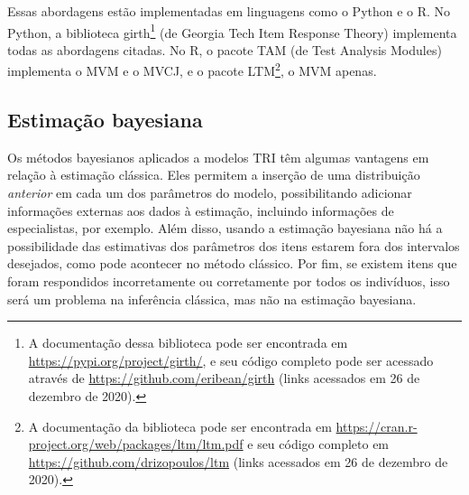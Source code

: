 \documentclass[
	12pt,				%
	openright,			%
	twoside,			%
	a4paper,			%
	english,			%
	brazil				%
	]{abntex2}
\begin{document}
 
 Essas abordagens estão implementadas em linguagens como o Python e o R. No Python, a biblioteca girth\footnote{A documentação dessa biblioteca pode ser encontrada em \url{https://pypi.org/project/girth/}, e seu código completo pode ser acessado através de \url{https://github.com/eribean/girth} (links acessados em 26 de dezembro de 2020).} (de Georgia Tech Item Response Theory) implementa todas as abordagens citadas. No R, o pacote TAM (de Test Analysis Modules) implementa o MVM e o MVCJ, e o pacote LTM\footnote{A documentação da biblioteca pode ser encontrada em \url{https://cran.r-project.org/web/packages/ltm/ltm.pdf} e seu código completo em \url{https://github.com/drizopoulos/ltm} (links acessados em 26 de dezembro de 2020).}, o MVM apenas.
 
 \subsection{Estimação bayesiana}
 Os métodos bayesianos aplicados a modelos TRI têm algumas vantagens em relação à estimação clássica. Eles permitem a inserção de uma distribuição \emph{anterior} em cada um dos parâmetros do modelo, possibilitando adicionar informações externas aos dados à estimação, incluindo informações de especialistas, por exemplo. Além disso, usando a estimação bayesiana não há a possibilidade das estimativas dos parâmetros dos itens estarem fora dos intervalos desejados, como pode acontecer no método clássico. Por fim, se existem itens que foram respondidos incorretamente ou corretamente por todos os indivíduos, isso será um problema na inferência clássica, mas não na estimação bayesiana.
 
\end{document}
